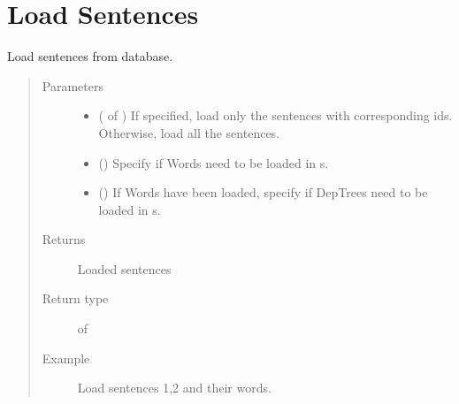 \documentclass[letterpaper,10pt,english]{sphinxmanual}
\begin{document}
\section{Load Sentences}
\label{\detokenize{index:module-loacore.load.sentence_load}}\label{\detokenize{index:load-sentences}}

\begin{fulllineitems}
\label{\detokenize{index:loacore.load.sentence_load.load_sentences}}
Load sentences from database.
\begin{quote}\begin{description}
\item[{Parameters}] \leavevmode\begin{itemize}
\item {} 
 ( of ) \textendash{} If specified, load only the sentences with corresponding ids. Otherwise, load all the sentences.

\item {} 
 () \textendash{} Specify if Words need to be loaded in  s.

\item {} 
 () \textendash{} If Words have been loaded, specify if DepTrees need to be loaded in  s.

\end{itemize}

\item[{Returns}] \leavevmode
Loaded sentences

\item[{Return type}] \leavevmode
{} of 

\item[{Example}] \leavevmode
Load sentences 1,2 and their words.


\end{description}
\end{quote}
\end{fulllineitems}
\end{document}
